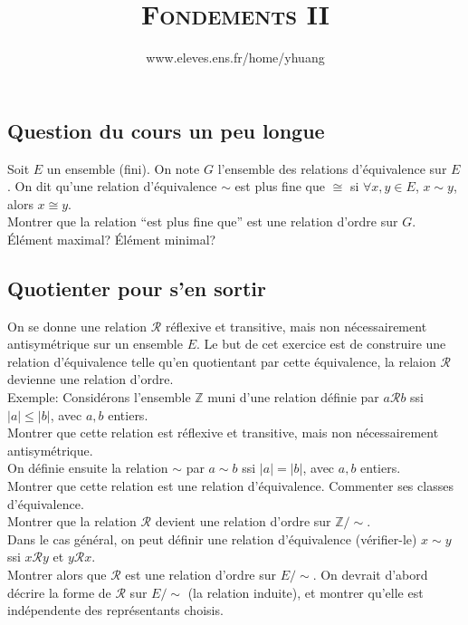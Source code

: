 \documentclass{article}
\begin{document}
\setcounter{section}{9}

\title{\textsc{Fondements II}}
\author{www.eleves.ens.fr/home/yhuang}
\date{}
\maketitle

\subsection{Question du cours un peu longue}
Soit $E$ un ensemble (fini). On note $G$ l'ensemble des relations d'\'equivalence sur $E$. On dit qu'une relation d'\'equivalence $\sim$ est plus fine que $\cong$ si $\forall x,y\in E$, $x\sim y$, alors $x\cong y$.\\
Montrer que la relation ``est plus fine que'' est une relation d'ordre sur $G$.\\
\'El\'ement maximal? \'El\'ement minimal?

\subsection{Quotienter pour s'en sortir}
On se donne une relation $\mathcal{R}$ r\'eflexive et transitive, mais non n\'ecessairement antisym\'etrique sur un ensemble $E$. Le but de cet exercice est de construire une relation d'\'equivalence telle qu'en quotientant par cette \'equivalence, la relaion $\mathcal{R}$ devienne une relation d'ordre.\\
\textsf{Exemple: Consid\'erons l'ensemble $\mathbb{Z}$ muni d'une relation d\'efinie par $a\mathcal{R}b$ ssi $|a|\leq|b|$, avec $a,b$ entiers.\\
Montrer que cette relation est r\'eflexive et transitive, mais non n\'ecessairement antisym\'etrique.\\
On d\'efinie ensuite la relation $\sim$ par $a\sim b$ ssi $|a|=|b|$, avec $a,b$ entiers.\\
Montrer que cette relation est une relation d'\'equivalence. Commenter ses classes d'\'equivalence.\\
Montrer que la relation $\mathcal{R}$ devient une relation d'ordre sur $\mathbb{Z}/\sim$.\\}
Dans le cas g\'en\'eral, on peut d\'efinir une relation d'\'equivalence (v\'erifier-le) $x\sim y$ ssi $x\mathcal{R}y$ et $y\mathcal{R}x$.\\
Montrer alors que $\mathcal{R}$ est une relation d'ordre sur $E/\sim$. On devrait d'abord d\'ecrire la forme de $\mathcal{R}$ sur $E/\sim$ (la relation induite), et montrer qu'elle est ind\'ependente des repr\'esentants choisis.
\end{document}
